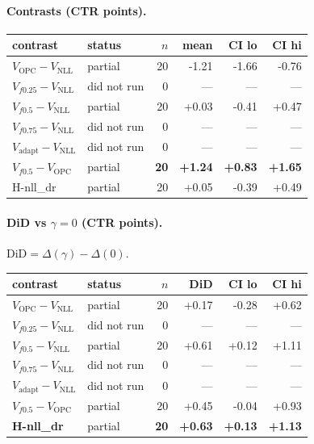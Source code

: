 \documentclass[10pt,a4paper]{article}
\begin{document}
\paragraph{Contrasts (CTR points).}
{\centering\small\begin{tabular}{llrrrr}
\toprule contrast & status & $n$ & mean & CI lo & CI hi \\
\midrule
$V_{\mathrm{OPC}}-V_{\mathrm{NLL}}$ & partial & 20 & -1.21 & -1.66 & -0.76 \\
$V_{f0.25}-V_{\mathrm{NLL}}$ & did not run & 0 & --- & --- & --- \\
$V_{f0.5}-V_{\mathrm{NLL}}$ & partial & 20 & +0.03 & -0.41 & +0.47 \\
$V_{f0.75}-V_{\mathrm{NLL}}$ & did not run & 0 & --- & --- & --- \\
$V_{\mathrm{adapt}}-V_{\mathrm{NLL}}$ & did not run & 0 & --- & --- & --- \\
\textbf{$V_{f0.5}-V_{\mathrm{OPC}}$} & partial & \textbf{20} & \textbf{+1.24} & \textbf{+0.83} & \textbf{+1.65} \\
H-nll\_dr & partial & 20 & +0.05 & -0.39 & +0.49 \\
\bottomrule\end{tabular}\par}
\paragraph{DiD vs $\gamma=0$ (CTR points).} $\mathrm{DiD}=\Delta(\gamma)-\Delta(0)$.
{\centering\small\begin{tabular}{llrrrr}
\toprule contrast & status & $n$ & DiD & CI lo & CI hi \\
\midrule
$V_{\mathrm{OPC}}-V_{\mathrm{NLL}}$ & partial & 20 & +0.17 & -0.28 & +0.62 \\
$V_{f0.25}-V_{\mathrm{NLL}}$ & did not run & 0 & --- & --- & --- \\
$V_{f0.5}-V_{\mathrm{NLL}}$ & partial & 20 & +0.61 & +0.12 & +1.11 \\
$V_{f0.75}-V_{\mathrm{NLL}}$ & did not run & 0 & --- & --- & --- \\
$V_{\mathrm{adapt}}-V_{\mathrm{NLL}}$ & did not run & 0 & --- & --- & --- \\
$V_{f0.5}-V_{\mathrm{OPC}}$ & partial & 20 & +0.45 & -0.04 & +0.93 \\
\textbf{H-nll\_dr} & partial & \textbf{20} & \textbf{+0.63} & \textbf{+0.13} & \textbf{+1.13} \\
\bottomrule\end{tabular}\par}
\bigskip
\end{document}
